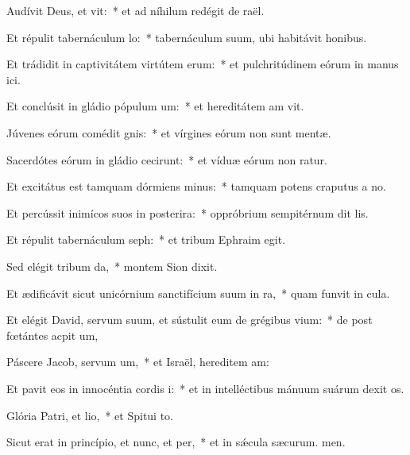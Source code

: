 \item Audívit Deus, et vit:~* et ad níhilum redégit de raël.
\item Et répulit tabernáculum lo:~* tabernáculum suum, ubi habitávit  honibus.
\item Et trádidit in captivitátem virtútem erum:~* et pulchritúdinem eórum in manus ici.
\item Et conclúsit in gládio pópulum um:~* et hereditátem am vit.
\item Júvenes eórum comédit gnis:~* et vírgines eórum non sunt mentæ.
\item Sacerdótes eórum in gládio cecirunt:~* et víduæ eórum non ratur.
\item Et excitátus est tamquam dórmiens minus:~* tamquam potens craputus a no.
\item Et percússit inimícos suos in posterira:~* oppróbrium sempitérnum dit lis.
\item Et répulit tabernáculum seph:~* et tribum Ephraim  egit.
\item Sed elégit tribum da,~* montem Sion  dixit.
\item Et ædificávit sicut unicórnium sanctifícium suum in ra,~* quam funvit in cula.
\item Et elégit David, servum suum, et sústulit eum de grégibus vium:~* de post fœtántes acpit um,
\item Páscere Jacob, servum um,~* et Israël, hereditem am:
\item Et pavit eos in innocéntia cordis i:~* et in intelléctibus mánuum suárum dexit os.
\item Glória Patri, et lio,~* et Spitui to.
\item Sicut erat in princípio, et nunc, et per,~* et in sǽcula sæcurum. men.
